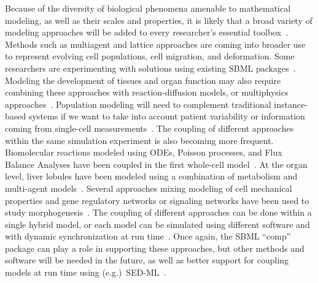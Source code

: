 \documentclass{sbml-paper}
\begin{document}
Because of the diversity of biological phenomena amenable to mathematical modeling, as well as their scales and properties, it is likely that a broad variety of modeling approaches will be added to every researcher's essential toolbox~\citep{Cvijovic2014bridging}.  Methods such as multiagent and lattice approaches are coming into broader use to represent evolving cell populations, cell migration, and deformation.  Some researchers are experimenting with solutions using existing SBML packages~\citep{watanabe2016efficient, varela2018epilog}.  Modeling the development of tissues and organ function may also require combining these approaches with reaction-diffusion models, or multiphysics approaches~\citep{Nickerson2016human}.  Population modeling will need to complement traditional instance-based systems if we want to take into account patient variability or information coming from single-cell measurements~\citep{Levin1997mathematical}.  The coupling of different approaches within the same simulation experiment is also becoming more frequent.  Biomolecular reactions modeled using ODEs, Poisson processes, and Flux Balance Analyses have been coupled in the first whole-cell model~\citep{Karr2015principles}.  At the organ level, liver lobules have been modeled using a combination of metabolism and multi-agent models~\citep{schliess2014integrated}.  Several approaches mixing modeling of cell mechanical properties and gene regulatory networks or signaling networks have been used to study morphogenesis~\citep[e.g.,][]{tanaka2015lbibcell}.  The coupling of different approaches can be done within a single hybrid model, or each model can be simulated using different software and with dynamic synchronization at run time~\citep{mattioni2013integration}.  Once again, the SBML ``comp'' package can play a role in supporting these approaches, but other methods and software will be needed in the future, as well as better support for coupling models at run time using (e.g.)\ SED-ML~\citep{waltemath2011reproducible}.
\end{document}
